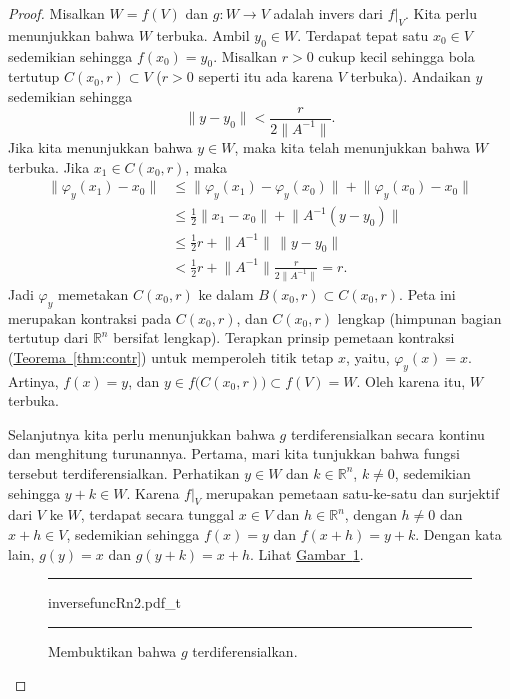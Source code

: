 \documentclass[12pt,openany]{book}
\newcommand{\snorm}[1]{\lVert {#1} \rVert}
\newcommand{\R}{{\mathbb{R}}}
\theoremstyle{plain}
\theoremstyle{remark}
\theoremstyle{definition}
\newenvironment{myfig}{%
\begin{figure}[h!t]
\noindent\rule{\textwidth}{0.5pt}\vspace{12pt}\par\centering}%
{\par\noindent\rule{\textwidth}{0.5pt}
\end{figure}}
\theoremstyle{exercise}
\theoremstyle{example}
\newcommand{\figureref}[1]{\hyperref[#1]{Gambar~\ref*{#1}}}
\newcommand{\thmref}[1]{\hyperref[#1]{Teorema~\ref*{#1}}}
\begin{document}
\begin{proof}
Misalkan $W = f(V)$ dan $g \colon W \to V$ adalah invers dari $f|_V$.
Kita perlu menunjukkan bahwa $W$ terbuka.  Ambil $y_0 \in W$.
Terdapat tepat satu $x_0 \in V$ sedemikian sehingga $f(x_0) = y_0$.
Misalkan $r > 0$ cukup kecil sehingga bola tertutup $C(x_0,r) \subset V$
($r > 0$ seperti itu ada karena $V$ terbuka).
Andaikan $y$ sedemikian sehingga
\begin{equation*}
\snorm{y-y_0} <
\frac{r}{2\snorm{A^{-1}}} .
\end{equation*}
Jika kita menunjukkan bahwa $y \in W$, maka kita telah menunjukkan bahwa $W$ terbuka.
Jika $x_1 \in
C(x_0,r)$, maka
\begin{equation*}
\begin{split}
\snorm{\varphi_y(x_1)-x_0}
& \leq
\snorm{\varphi_y(x_1)-\varphi_y(x_0)} +
\snorm{\varphi_y(x_0)-x_0} \\
& \leq
\frac{1}{2}\snorm{x_1-x_0} +
\snorm{A^{-1}(y-y_0)} \\
& \leq
\frac{1}{2}r +
\snorm{A^{-1}} \, \snorm{y-y_0} \\
& <
\frac{1}{2}r +
\snorm{A^{-1}}
\frac{r}{2\snorm{A^{-1}}} = r .
\end{split}
\end{equation*}
Jadi $\varphi_y$ memetakan $C(x_0,r)$ ke dalam $B(x_0,r) \subset C(x_0,r)$.  Peta ini merupakan
kontraksi pada $C(x_0,r)$, dan $C(x_0,r)$ lengkap (himpunan bagian tertutup dari $\R^n$
bersifat lengkap).
Terapkan prinsip pemetaan kontraksi (\thmref{thm:contr})
untuk memperoleh titik tetap $x$,
yaitu, $\varphi_y(x) = x$.  Artinya, $f(x) = y$, dan $y \in
f\bigl(C(x_0,r)\bigr) \subset f(V) = W$.  Oleh karena itu, $W$ terbuka.

Selanjutnya kita perlu menunjukkan bahwa $g$ terdiferensialkan secara kontinu dan menghitung
turunannya.  Pertama, mari kita tunjukkan bahwa fungsi tersebut terdiferensialkan.
Perhatikan $y \in W$ dan $k \in \R^n$, $k \neq 0$, sedemikian sehingga $y+k \in W$.
Karena $f|_V$ merupakan pemetaan satu-ke-satu dan surjektif dari $V$ ke $W$,
terdapat secara tunggal
$x \in V$ dan $h \in \R^n$, dengan $h \neq 0$ dan $x+h \in V$, sedemikian sehingga
$f(x) = y$ dan $f(x+h) = y+k$.
Dengan kata lain, $g(y) = x$ dan $g(y+k) = x+h$.  Lihat
\figureref{fig:inversefuncRn2}.
\begin{myfig}
{inversefuncRn2.pdf_t}
\caption{Membuktikan bahwa $g$ terdiferensialkan.\label{fig:inversefuncRn2}}
\end{myfig}


\end{proof}
\end{document}

